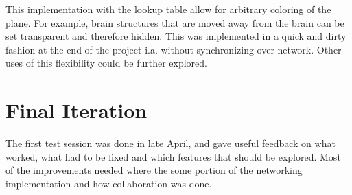 This implementation with the lookup table allow for arbitrary coloring of the plane. For example, brain structures that are moved away from the brain can be set transparent and therefore hidden. This was implemented in a quick and dirty fashion at the end of the project i.a. without synchronizing over network. Other uses of this flexibility could be further explored. 




























\subsubsection*{}



\section[Final Iteration]{Final Iteration}\label{chap:finaliter}

The first test session was done in late April, and gave useful feedback on what worked, what had to be fixed and which features that should be explored. Most of the improvements needed where the some portion of the networking implementation and how collaboration was done. 




